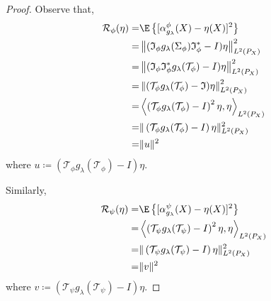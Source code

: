 \documentclass{article} %
\newcommand{\I}{\mathfrak{I}}
\newcommand{\repone}{\phi}
\newcommand{\reptwo}{\psi}
\newcommand{\Sone}{\Sigma_{\repone}}
\newcommand{\Tone}{\mathcal{T}_{\repone}}
\newcommand{\Ttwo}{\mathcal{T}_{\reptwo}}
\newcommand{\gl}{g_{\lambda}}
\newcommand{\LPtwo}{L^{2}(P_{X})}
\newcommand{\Riskrepone}{\mathcal{R}_{\repone}}
\newcommand{\Riskreptwo}{\mathcal{R}_{\reptwo}}
\theoremstyle{plain}
\begin{document}
\begin{proof}
Observe that,
\[\begin{aligned}
   \Riskrepone (\eta)=& \E\left\{[\alpha_{\gl}^{\repone}(X) - \eta(X)]^2\right\} \\
   =& \left\|(\I_{\repone}\gl(\Sone)\I_{\repone}^*- I)\eta\right\|_{\LPtwo}^{2}\\
   =& \left\|(\I_{\repone}\I_{\repone}^*\gl(\Tone)- I)\eta\right\|_{\LPtwo}^{2}\\
   =& \left\|(\Tone\gl(\Tone)- \I)\eta\right\|_{\LPtwo}^{2}\\
   =&\left \langle \left(\Tone\gl(\Tone)- I\right)^{2}\eta, \eta \right\rangle_{\LPtwo}\\
   =&\|\left(\Tone\gl(\Tone)- I\right)\eta\|_{\LPtwo}^2\\
   = & \|u\|^2
\end{aligned} \]
where $u \coloneqq \left(\Tone\gl(\Tone)- I\right)\eta$.

Similarly,
\[\begin{aligned}
   \Riskreptwo (\eta)=& \E\left\{[\alpha_{\gl}^{\reptwo}(X) - \eta(X)]^2\right\} \\
    =&\left \langle \left(\Ttwo\gl(\Ttwo)- I\right)^{2}\eta, \eta \right\rangle_{\LPtwo}\\
    =&\|\left(\Ttwo\gl(\Ttwo)- I\right)\eta\|_{\LPtwo}^2\\
   = & \|v\|^2
\end{aligned} \]
where $v \coloneqq \left(\Ttwo\gl(\Ttwo)- I\right)\eta$. 


\end{proof}
\end{document}
